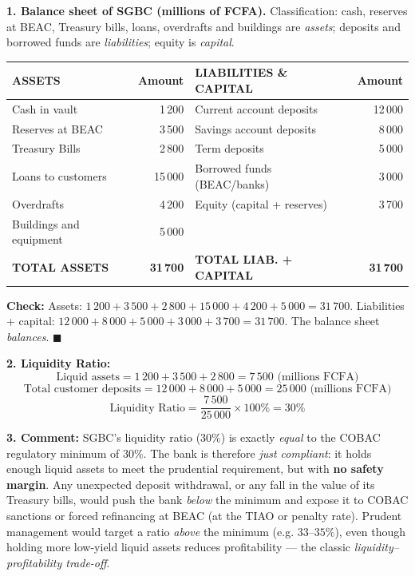 \documentclass[11pt]{article}
\begin{document}
\begin{corrige}

\textbf{1. Balance sheet of SGBC (millions of FCFA).} Classification: cash, reserves at BEAC, Treasury bills, loans, overdrafts and buildings are \emph{assets}; deposits and borrowed funds are \emph{liabilities}; equity is \emph{capital}.

\begin{center}
\begin{tabularx}{\linewidth}{|X r|X r|}
\hline
\rowcolor{popblueL} \textbf{ASSETS} & \textbf{Amount} & \textbf{LIABILITIES \& CAPITAL} & \textbf{Amount} \\
\hline
Cash in vault & 1\,200 & Current account deposits & 12\,000 \\
\hline
Reserves at BEAC & 3\,500 & Savings account deposits & 8\,000 \\
\hline
Treasury Bills & 2\,800 & Term deposits & 5\,000 \\
\hline
Loans to customers & 15\,000 & Borrowed funds (BEAC/banks) & 3\,000 \\
\hline
Overdrafts & 4\,200 & Equity (capital + reserves) & 3\,700 \\
\hline
Buildings and equipment & 5\,000 & & \\
\hline
\rowcolor{popgreenL} \textbf{TOTAL ASSETS} & \textbf{31\,700} & \textbf{TOTAL LIAB. + CAPITAL} & \textbf{31\,700} \\
\hline
\end{tabularx}
\end{center}

\textbf{Check:} Assets: $1\,200 + 3\,500 + 2\,800 + 15\,000 + 4\,200 + 5\,000 = 31\,700$. Liabilities + capital: $12\,000 + 8\,000 + 5\,000 + 3\,000 + 3\,700 = 31\,700$. The balance sheet \emph{balances}. $\blacksquare$

\textbf{2. Liquidity Ratio:}
\[
\text{Liquid assets} = 1\,200 + 3\,500 + 2\,800 = 7\,500 \text{ (millions FCFA)}
\]
\[
\text{Total customer deposits} = 12\,000 + 8\,000 + 5\,000 = 25\,000 \text{ (millions FCFA)}
\]
\[
\text{Liquidity Ratio} = \frac{7\,500}{25\,000} \times 100\% = 30\%
\]

\textbf{3. Comment:} SGBC's liquidity ratio ($30\%$) is exactly \emph{equal} to the COBAC regulatory minimum of $30\%$. The bank is therefore \emph{just compliant}: it holds enough liquid assets to meet the prudential requirement, but with \textbf{no safety margin}. Any unexpected deposit withdrawal, or any fall in the value of its Treasury bills, would push the bank \emph{below} the minimum and expose it to COBAC sanctions or forced refinancing at BEAC (at the TIAO or penalty rate). Prudent management would target a ratio \emph{above} the minimum (e.g. $33$--$35\%$), even though holding more low-yield liquid assets reduces profitability — the classic \emph{liquidity--profitability trade-off}.
\end{corrige}
\end{document}

